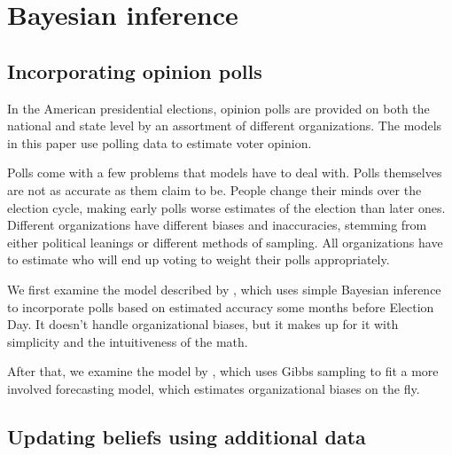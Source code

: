 \documentclass[thesis.tex]{subfiles}
\begin{document}
\section{Bayesian inference}

\subsection{Incorporating opinion polls}

In the American presidential elections, opinion polls are provided on both the national and state level by an assortment of different organizations. The models in this paper use polling data to estimate voter opinion.

Polls come with a few problems that models have to deal with. Polls themselves are not as accurate as them claim to be. People change their minds over the election cycle, making early polls worse estimates of the election than later ones. Different organizations have different biases and inaccuracies, stemming from either political leanings or different methods of sampling. All organizations have to estimate who will end up voting to weight their polls appropriately.

We first examine the model described by \cite{Lock:2010aa}, which uses simple Bayesian inference to incorporate polls based on estimated accuracy some months before Election Day. It doesn't handle organizational biases, but it makes up for it with simplicity and the intuitiveness of the math.

After that, we examine the model by \cite{Strauss:2007aa}, which uses Gibbs sampling to fit a more involved forecasting model, which estimates organizational biases on the fly.

\begin{comment}
- problem: how accurate/useful are they? how many months before campaign (problems 
  with changing mind, making up mind, uncertainty about who will vote)

  (Lock)'s approach: Bayesian inference

  (Strauss): Gibbs

- problem: organization biases. empirically, political leanings, or different 
  methods of polling/sampling, guessing who will actually vote

  (Strauss) Gibbs
  Nate Silver: historical data
\end{comment}

\subsection{Updating beliefs using additional data}
\end{document}

